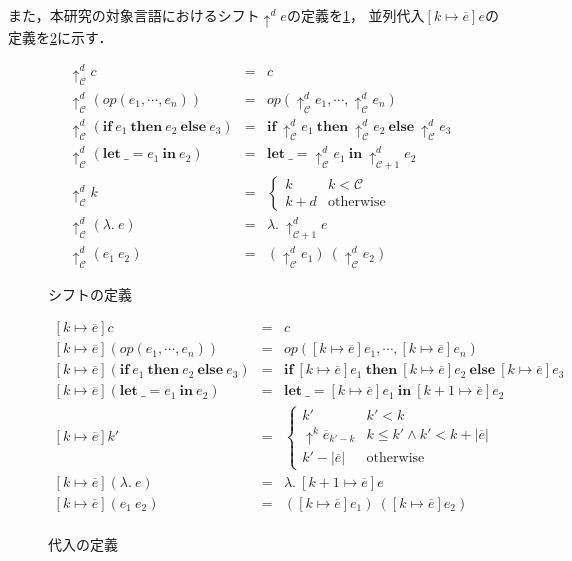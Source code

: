 \documentclass[T]{compsoft}
\newcommand{\keyword}[1]{\mathbf{#1}}
\newcommand{\IF}{\keyword{if}}
\newcommand{\THEN}{\keyword{then}}
\newcommand{\ELSE}{\keyword{else}}
\newcommand{\LET}{\keyword{let}}
\newcommand{\IN}{\keyword{in}}
\begin{document}
また，本研究の対象言語におけるシフト$\uparrow^d e$の定義を\figurename\ref{eqn:target-shift}，
並列代入$[k\mapsto \overline{e}]e$の定義を\figurename\ref{eqn:target-subst}に示す．
\begin{figure}[htbp]
	\[ \begin{array}{lll}
			\uparrow^d_\mathcal{C} c & = & c \\
			\uparrow^d_\mathcal{C} (\textit{op} (e_1,\cdots,e_n)) & = & \textit{op} (\uparrow^d_\mathcal{C} e_1,\cdots,\uparrow^d_\mathcal{C} e_n) \\
			\uparrow^d_\mathcal{C} (\IF~e_1~\THEN~e_2~\ELSE~e_3) & = & \IF~\uparrow^d_\mathcal{C} e_1~\THEN~\uparrow^d_\mathcal{C} e_2~\ELSE~\uparrow^d_\mathcal{C} e_3 \\
			\uparrow^d_\mathcal{C} (\LET~\_=e_1~\IN~e_2) & = & \LET~\_=\uparrow^d_\mathcal{C} e_1~\IN~\uparrow^d_{\mathcal{C} + 1}e_2 \\
			\uparrow^d_\mathcal{C} k & = & \left \{ \begin{array}{ll} k & k < \mathcal{C} \\ k + d & \mbox{otherwise} \end{array} \right. \\
			\uparrow^d_\mathcal{C} (\lambda.~e) & = & \lambda.~\uparrow^d_{\mathcal{C}+1} e \\
			\uparrow^d_\mathcal{C} (e_1~e_2) & = & (\uparrow^d_\mathcal{C} e_1)~(\uparrow^d_\mathcal{C} e_2)
	\end{array} \]
	\caption{シフトの定義}
	\label{eqn:target-shift}
\end{figure}

\begin{figure}[htbp]
	\[ \begin{array}{lll}
			[k \mapsto \overline{e}]c & = & c \\
			\left[k \mapsto \overline{e}\right] (\textit{op} (e_1, \cdots , e_n)) & = & \textit{op} ([k \mapsto \overline{e}]e_1,\cdots , [k \mapsto \overline{e}]e_n) \\
			\left[k \mapsto \overline{e}\right](\IF~e_1~\THEN~e_2~\ELSE~e_3) & = &  \IF~[k \mapsto \overline{e}]e_1~\THEN~[k \mapsto \overline{e}]e_2~\ELSE~[k \mapsto \overline{e}]e_3 \\
			\left[k \mapsto \overline{e}\right](\LET~\_=e_1~\IN~e_2) & = & \LET~\_=[k \mapsto \overline{e}]e_1~\IN~[k + 1 \mapsto \overline{e}]e_2 \\
		\left[k \mapsto \overline{e}\right]k' & = & \left\{ \begin{array}{ll} k' & k' < k \\ \uparrow^k \overline{e}_{k'-k} & k \leq k' \land k' < k + |\overline{e}| \\ k' - |\overline{e}| & \mbox{otherwise} \end{array} \right. \\
			\left[k \mapsto \overline{e}\right](\lambda.~e) & = & \lambda.~[k + 1 \mapsto \overline{e}]e \\
			\left[k \mapsto \overline{e}\right](e_1~e_2) & = & ([k \mapsto \overline{e}]e_1)~([k \mapsto \overline{e}]e_2) \\
	\end{array} \]
	\caption{代入の定義}
	\label{eqn:target-subst}
\end{figure}
\end{document}
